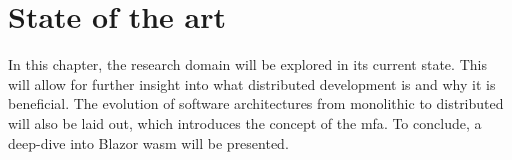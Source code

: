 
\chapter{State of the art}
\label{ch:state-of-the-art}





In this chapter, the research domain will be explored in its current state. This
will allow for further insight into what distributed development is and why it
is beneficial. The evolution of software architectures from \gls{monolithic} to
distributed will also be laid out, which introduces the concept of the
\gls{mfa}. To conclude, a deep-dive into Blazor \Gls{wasm} will be presented.





